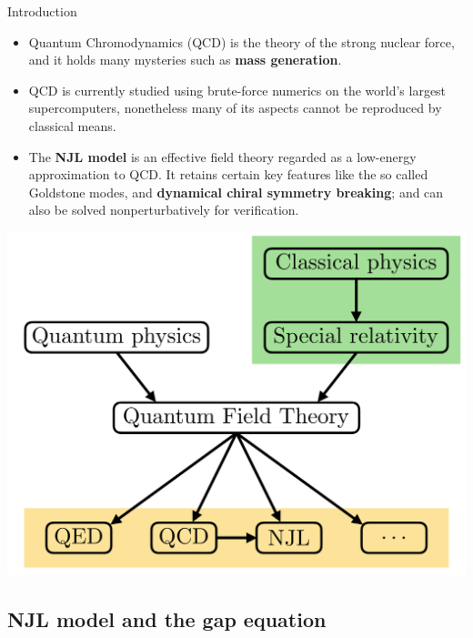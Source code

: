 \documentclass[9pt, aspectratio=169]{beamer}
\begin{document}
\begin{frame}{Introduction}

	\begin{multicols}{2}

		\begin{itemize}
			\item<2-> Quantum Chromodynamics (QCD) is the theory of the strong nuclear force, and it holds many mysteries such as \textbf{mass generation}.
			\item<2-> QCD is currently studied using brute-force numerics on the world’s largest supercomputers, nonetheless many of its aspects cannot be reproduced by classical means.
			\item<3-> The \textbf{NJL model} is an effective field theory regarded as a low-energy approximation to QCD. It retains certain key features like the so called Goldstone modes, and \textbf{dynamical chiral symmetry breaking}; and can also be solved nonperturbatively for verification.
		\end{itemize}

		\begin{center}
			\includegraphics[width=.40\paperwidth]{Figures/quantum-field-theory}
		\end{center}

	\end{multicols}

\end{frame}


\subsection{NJL model and the gap equation}
\end{document}
